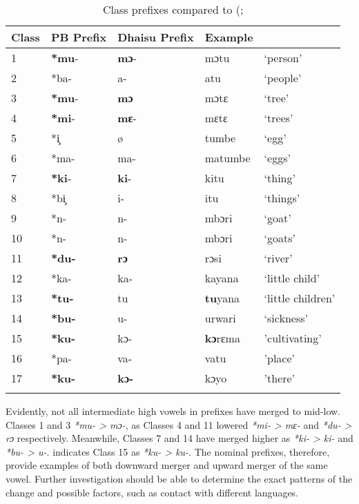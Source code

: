 \documentclass[output=paper,colorlinks,citecolor=brown]{langscibook}
\begin{document}
\begin{table}
\caption{Class prefixes compared to (\citealt[97]{Meeussen1967}; \citealt[14]{RugemaliraEtAl2019}}
\label{tab:ngonyani:14}
    \begin{tabular}{l l l l l}
    \lsptoprule
        Class & PB Prefix & Dhaisu Prefix & Example\\
    \midrule
        1 & \textbf{*mu}-   & \textbf{mɔ}-  & mɔtu              & ‘person’\\
        2 & *ba-            & a-            & atu               & ‘people’\\
        3 & \textbf{*mu}-   & \textbf{mɔ }  & mɔtɛ              & ‘tree’\\
        4 & \textbf{*mi}-   & \textbf{mɛ}-  & mɛtɛ              & ‘trees’\\
        5 & *i̧              & ø             & tumbe             & ‘egg’\\
        6 & *ma-            & ma-           & matumbe           & ‘eggs’\\
        7 & \textbf{*ki}-   & \textbf{ki}-  & kitu              & ‘thing’\\
        8 & *bi̧             & i-            & itu               & ‘things’\\
        9 & *n-             & n-            & mbɔri             & ‘goat’\\
        10 & *n-            & n-            & mbɔri             & ‘goats’\\
        11 & \textbf{*du-}  & \textbf{rɔ}   & rɔsi              & ‘river’\\
        12 & *ka-           & ka-           & kayana            & ‘little child’\\
        13 & \textbf{*tu-}  & tu            & \textbf{tu}yana   & ‘little children’\\
        14 & \textbf{*bu-}  & u-            & urwari            & ‘sickness’\\
        15 & \textbf{*ku-}  & kɔ-           & \textbf{kɔ}rɛma   & 'cultivating'  \\
        16 & *pa-           & va-           & vatu              & 'place’\\
        17 & \textbf{*ku-}  & \textbf{kɔ-}  & kɔyo              & 'there' \\
    \lspbottomrule
    \end{tabular}
\end{table}

Evidently, not all intermediate high vowels in prefixes have merged to mid-low. Classes 1 and 3 \textit{*mu- > mɔ-}, as Classes 4 and 11 lowered \textit{*mi- > mɛ-} and \textit{*du- > rɔ} respectively. Meanwhile, Classes 7  and 14 have merged higher as \textit{*ki- > ki-} and \textit{*bu- > u-}. \cite[32]{Nurse2000}  indicates Class 15 as \textit{*ku- > ku-}. The nominal prefixes, therefore, provide examples of both downward merger and upward merger of the same vowel. Further investigation should be able to determine the exact patterns of the change and possible factors, such as contact with different languages.
\end{document}
